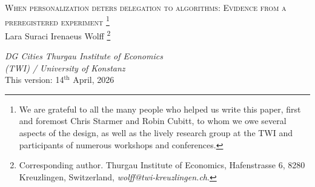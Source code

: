 \documentclass[a4paper, 12pt, fleqn]{article}
\title{\mytitle}
\date{}
\theoremstyle{definition}
\newcommand{\symbolfootnote}[1]{\begingroup%
\renewcommand{\thefootnote}{\fnsymbol{footnote}}\footnote{#1}\endgroup}
\newcommand{\mytitle}{{\Large \textsc{When personalization deters delegation to algorithms: Evidence from a preregistered experiment}}}
\begin{document}
 
\thispagestyle{empty}
\begin{center}
	\mytitle\symbolfootnote{We are grateful to all the many people who helped us write this paper, first and foremost Chris Starmer and Robin Cubitt, to whom we owe several aspects of the design, as well as the lively research group at the TWI and participants of numerous workshops and conferences.}
  \vspace{.55cm}\\
 Lara Suraci \qquad\qquad\qquad Irenaeus Wolff\symbolfootnote{Corresponding author. Thurgau Institute of Economics, Hafenstrasse 6, 8280 Kreuzlingen, Switzerland, \textit{wolff@twi-kreuzlingen.ch}.}
\\\vspace{.25cm}
 \begin{small}
  \phantom{mortext}\textit{DG Cities \qquad\qquad Thurgau Institute of Economics \\ \phantom{moretext}\phantom{University} \qquad\qquad (TWI) / University of Konstanz} %
  \vspace{.03cm}\\
\vspace{.6cm}
 {This version: 14$^{\text{th}}$ April, 2026}
\vspace{.6cm}
\end{small}
\end{center}
\end{document}
